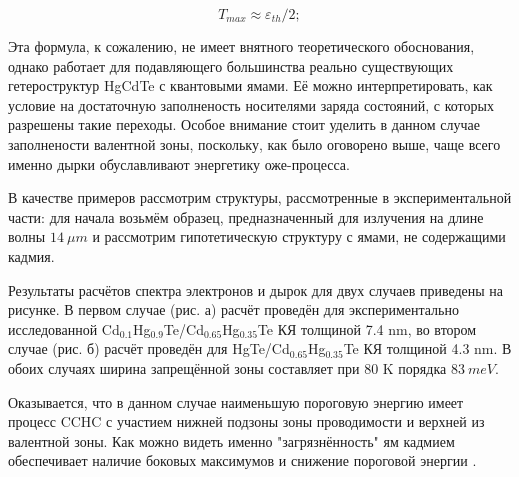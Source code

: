 \documentclass[../main.tex]{subfiles}
\begin{document}
        \begin{equation}
            \label{tmax}
            T_{max} \approx \varepsilon_{th} / 2;
        \end{equation}

        Эта формула, к сожалению, не имеет внятного теоретического обоснования,
        однако работает для подавляющего большинства реально существующих гетероструктур
        HgCdTe с квантовыми ямами. Её можно интерпретировать, как условие на достаточную
        заполненость носителями заряда состояний, с которых разрешены такие переходы.
        Особое внимание стоит уделить в данном случае заполнености валентной зоны, поскольку,
        как было оговорено выше, чаще всего именно дырки обуславливают энергетику оже-процесса.

        В качестве примеров рассмотрим структуры, рассмотренные в экспериментальной части:
        для начала возьмём образец, предназначенный для излучения на длине волны $14~\mu m$
        и рассмотрим гипотетическую структуру с ямами, не содержащими кадмия.

        Результаты расчётов спектра электронов и дырок для двух случаев приведены на рисунке. В первом случае (рис. а) расчёт
        проведён для экспериментально исследованной Cd${}_{0.1}$Hg${}_{0.9}$Te/Cd${}_{0.65}$Hg${}_{0.35}$Te КЯ толщиной 7.4 nm, во втором случае (рис. б)
        расчёт проведён для HgTe/Cd${}_{0.65}$Hg${}_{0.35}$Te КЯ толщиной 4.3 nm. В обоих случаях ширина запрещённой зоны составляет при 
        80 K порядка $83~meV$. 

        Оказывается, что в данном случае наименьшую пороговую энергию имеет процесс
        CCHC с участием нижней подзоны зоны проводимости и верхней из валентной зоны.
        Как можно видеть именно "загрязнённость" ям кадмием обеспечивает наличие 
        боковых максимумов и снижение пороговой энергии \cite{Rumyantsev:IOP:2018}. 
\end{document}
